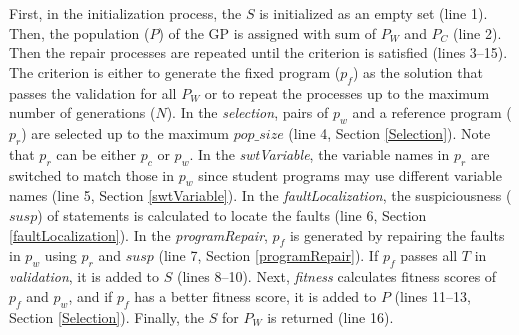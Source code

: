 \documentclass[10pt,conference]{IEEEtran}
\begin{document}
        First, in the initialization process, the $S$ is initialized as an empty set (line 1). Then, the population ($P$) of the GP is assigned with sum of $P_{W}$ and $P_{C}$ (line 2). Then the repair processes are repeated until the criterion is satisfied (lines 3–15). The criterion is either to generate the fixed program ($p_{f}$) as the solution that passes the validation for all $P_{W}$ or to repeat the processes up to the maximum number of generations ($N$). In the \textit{selection}, pairs of $p_{w}$ and a reference program ($p_{r}$) are selected up to the maximum $pop\_size$ (line 4, Section \ref{Selection}). Note that $p_{r}$ can be either $p_{c}$ or $p_{w}$. In the \textit{swtVariable}, the variable names in $p_{r}$ are switched to match those in $p_{w}$ since student programs may use different variable names (line 5, Section \ref{swtVariable}). In the \textit{faultLocalization}, the suspiciousness ($susp$) of statements is calculated to locate the faults (line 6, Section \ref{faultLocalization}). In the \textit{programRepair}, $p_{f}$ is generated by repairing the faults in $p_{w}$ using $p_{r}$ and $susp$ (line 7, Section \ref{programRepair}). If $p_{f}$ passes all $T$ in \textit{validation}, it is added to $S$ (lines 8–10). Next, \textit{fitness} calculates fitness scores of $p_{f}$ and $p_{w}$, and if $p_{f}$ has a better fitness score, it is added to $P$ (lines 11–13, Section \ref{Selection}). Finally, the $S$ for $P_{W}$ is returned (line 16).
\end{document}

